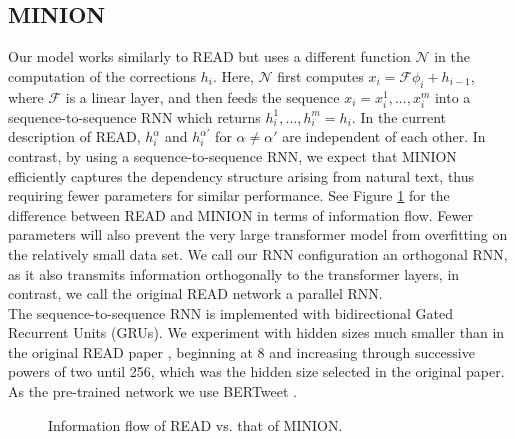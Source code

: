 \documentclass[10pt,conference,compsocconf]{IEEEtran}
\begin{document}
\subsection{MINION}
Our model works similarly to READ but uses a different function $\mathcal N$ in the computation of the corrections $h_i$. Here, $\mathcal N$ first computes $x_i=\mathcal F\phi_i + h_{i-1}$, where $\mathcal F$ is a linear layer, and then feeds the sequence $x_i=x_i^1,...,x_i^m$ into a sequence-to-sequence RNN which returns $h_i^1,...,h_i^m=h_i$. In the current description of READ, $h_i^\alpha$ and $h_i^{\alpha'}$ for $\alpha\neq\alpha'$ are independent of each other. In contrast, by using a sequence-to-sequence RNN, we expect that MINION efficiently captures the dependency structure arising from natural text, thus requiring fewer parameters for similar performance. See Figure \ref{fig:informationflow} for the difference between READ and MINION in terms of information flow.  Fewer parameters will also prevent the very large transformer model from overfitting on the relatively small data set. We call our RNN configuration an orthogonal RNN, as it also transmits information orthogonally to the transformer layers, in contrast, we call the original READ network a parallel RNN.\\
The sequence-to-sequence RNN is implemented with bidirectional Gated Recurrent Units (GRUs). We experiment with hidden sizes much smaller than in the original READ paper \cite{read}, beginning at 8 and increasing through successive powers of two until 256, which was the hidden size selected in the original paper.
As the pre-trained network we use BERTweet \cite{nguyen2020bertweet}.

\begin{figure}[htbp]
  \centering
  
  \caption{Information flow of READ vs. that of MINION.}
  \label{fig:informationflow}
\end{figure}
\end{document}
